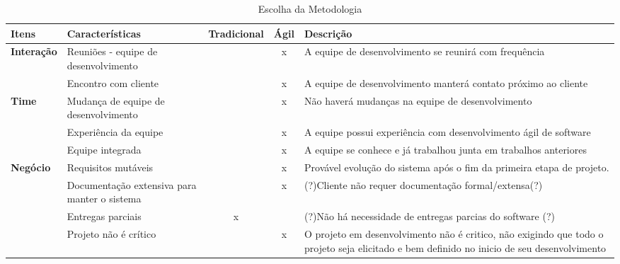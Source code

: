 	\begin{table}[hbpt]
	\huge
		\begin{adjustbox}{width=1.0\textwidth}
			\begin{tabular}{|l|l|c|c|p{10cm}|}
				\hline
				\textbf{Itens} & \textbf{Características} & \textbf{Tradicional} & \textbf{Ágil} & \textbf{Descrição} \\ \hline
				\multicolumn{ 1}{|l|}{\textbf{Interação}} & Reuniões - equipe de desenvolvimento &  & x & A equipe de desenvolvimento se reunirá com frequência \\ \cline{ 2- 5}
				\multicolumn{ 1}{|l|}{} & Encontro com cliente &  & x & A equipe de desenvolvimento manterá contato próximo ao cliente \\ \hline
				\multicolumn{ 1}{|l|}{\textbf{Time}} & Mudança de equipe de desenvolvimento &  & x & Não haverá mudanças na equipe de desenvolvimento \\ \cline{ 2- 5}
				\multicolumn{ 1}{|l|}{} & Experiência da equipe &  & x & A equipe possui experiência com desenvolvimento ágil de software \\ \cline{ 2- 5}
				\multicolumn{ 1}{|l|}{} & Equipe integrada &  & x & A equipe se conhece e já trabalhou junta em trabalhos anteriores \\ \hline
				\multicolumn{ 1}{|l|}{\textbf{Negócio}} & Requisitos mutáveis &  & x & Provável evolução do sistema após o fim da primeira etapa de projeto. \\ \cline{ 2- 5}
				\multicolumn{ 1}{|l|}{} & Documentação extensiva para manter o sistema &  & x & (?)Cliente não requer documentação formal/extensa(?) \\ \cline{ 2- 5}
				\multicolumn{ 1}{|l|}{} & Entregas parciais & x &  & (?)Não há necessidade de entregas parcias do software (?) \\ \cline{ 2- 5}
				\multicolumn{ 1}{|l|}{} & Projeto não é crítico &  & x & O projeto em desenvolvimento não é critico, não exigindo que todo o projeto seja elicitado e bem definido no inicio de seu desenvolvimento \\ \hline
			\end{tabular}
		\end{adjustbox}
		\caption{Escolha da Metodologia}
		\label{Escolha da Metodologia}
	\end{table}

	 


